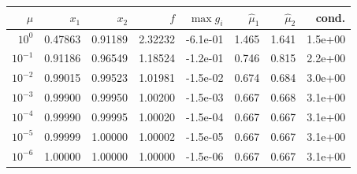 \begin{tabular}{rrrrrrrr}\toprule
$\mu$ & $x_1$ & $x_2$ & $f$ & $\max g_i$ & $\hat\mu_1$ & $\hat\mu_2$ & cond.\\\midrule
$10^{0}$ & 0.47863 & 0.91189 & 2.32232 & -6.1e-01 & 1.465 & 1.641 & 1.5e+00\\
$10^{-1}$ & 0.91186 & 0.96549 & 1.18524 & -1.2e-01 & 0.746 & 0.815 & 2.2e+00\\
$10^{-2}$ & 0.99015 & 0.99523 & 1.01981 & -1.5e-02 & 0.674 & 0.684 & 3.0e+00\\
$10^{-3}$ & 0.99900 & 0.99950 & 1.00200 & -1.5e-03 & 0.667 & 0.668 & 3.1e+00\\
$10^{-4}$ & 0.99990 & 0.99995 & 1.00020 & -1.5e-04 & 0.667 & 0.667 & 3.1e+00\\
$10^{-5}$ & 0.99999 & 1.00000 & 1.00002 & -1.5e-05 & 0.667 & 0.667 & 3.1e+00\\
$10^{-6}$ & 1.00000 & 1.00000 & 1.00000 & -1.5e-06 & 0.667 & 0.667 & 3.1e+00\\
\bottomrule\end{tabular}
